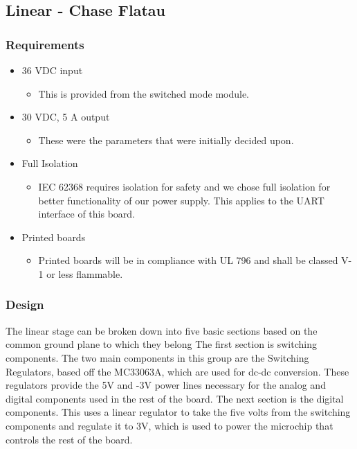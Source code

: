 \documentclass[15pt]{article}
\begin{document}
\subsection{Linear - Chase Flatau}

\subsubsection{Requirements}
\begin{itemize}
\item 36 VDC input \begin{itemize}
    \item This is provided from the switched mode module.
\end{itemize}
\item 30 VDC, 5 A output \begin{itemize}
    \item These were the parameters that were initially decided upon.
\end{itemize}
\item Full Isolation \begin{itemize}
    \item IEC 62368 \cite{5} requires isolation for safety and we chose full isolation for better functionality of our power supply. This applies to the UART interface of this board.
\end{itemize}
\item Printed boards \begin{itemize}
    \item Printed boards will be in compliance with UL 796\cite{796} and shall be classed V-1 or less flammable.
\end{itemize}
\end{itemize}

\subsubsection{Design}


The linear stage can be broken down into five basic sections based on the common ground plane to which they belong The first section is switching components. The two main components in this group are the Switching Regulators, based off the MC33063A, which are used for dc-dc conversion. These regulators provide the 5V and -3V power lines necessary for the analog and digital components used in the rest of the board. The next section is the digital components. This uses a linear regulator to take the five volts from the switching components and regulate it to 3V, which is used to power the microchip that controls the rest of the board.
\end{document}

